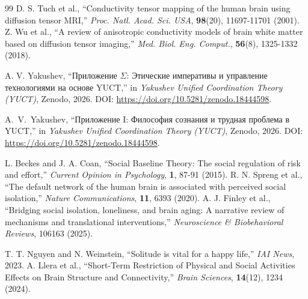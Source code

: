 \documentclass[12pt,a4paper]{article}
\begin{document}
\begin{thebibliography}{99}
		 D. S. Tuch et al., ``Conductivity tensor mapping of the human brain using diffusion tensor MRI,'' \emph{Proc. Natl. Acad. Sci. USA}, \textbf{98}(20), 11697-11701 (2001).
		 Z. Wu et al., ``A review of anisotropic conductivity models of brain white matter based on diffusion tensor imaging,'' \emph{Med. Biol. Eng. Comput.}, \textbf{56}(8), 1325-1332 (2018).
		
		 A. V. Yakushev, ``Приложение \(\Sigma\): Этические императивы и управление технологиями на основе YUCT,'' in \emph{Yakushev Unified Coordination Theory (YUCT)}, Zenodo, 2026. DOI: \url{https://doi.org/10.5281/zenodo.18444598}.
		
		 A.~V.~Yakushev, ``Приложение I: Философия сознания и трудная проблема в YUCT,'' in \emph{Yakushev Unified Coordination Theory (YUCT)}, Zenodo, 2026. DOI: \url{https://doi.org/10.5281/zenodo.18444598}.
		
		 L. Beckes and J. A. Coan, ``Social Baseline Theory: The social regulation of risk and effort,'' \emph{Current Opinion in Psychology}, \textbf{1}, 87-91 (2015).
		 R. N. Spreng et al., ``The default network of the human brain is associated with perceived social isolation,'' \emph{Nature Communications}, \textbf{11}, 6393 (2020).
		 A. J. Finley et al., ``Bridging social isolation, loneliness, and brain aging: A narrative review of mechanisms and translational interventions,'' \emph{Neuroscience \& Biobehavioral Reviews}, 106163 (2025).
		
		 T. T. Nguyen and N. Weinstein, ``Solitude is vital for a happy life,'' \emph{IAI News}, 2023.
		 A. Llera et al., ``Short-Term Restriction of Physical and Social Activities Effects on Brain Structure and Connectivity,'' \emph{Brain Sciences}, \textbf{14}(12), 1234 (2024).
		
	\end{thebibliography}
	
\end{document}
